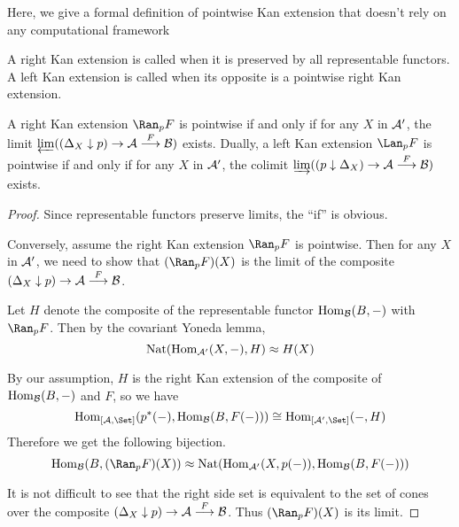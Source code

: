   Here, we give a formal definition of pointwise Kan extension that doesn't rely on any computational framework
  \begin{defn}
    A right Kan extension is called  when it is preserved by all representable functors. A left Kan extension is called  when its opposite is a pointwise right Kan extension.
  \end{defn}

  \begin{thm}\label{thm:pointwise Kan extension}
    A right Kan extension $\Ran_pF$ is pointwise if and only if for any $X$ in ${\cal A}'$, the limit $\operatorname*{\underleftarrow{\lim}}((\Delta_X\downarrow p)\to{\cal A}\stackrel{{F}}{\longrightarrow}{\cal B})$ exists.
    Dually, a left Kan extension $\Lan_pF$ is pointwise if and only if for any $X$ in ${\cal A}'$, the colimit $ \operatorname*{\underrightarrow{\lim}}((p\downarrow\Delta_X)\to{\cal A}\stackrel{{F}}{\longrightarrow}{\cal B})$ exists.
  \end{thm}
  \begin{proof}
    Since representable functors preserve limits, the ``if'' is obvious.

    Conversely, assume the right Kan extension $\Ran_pF$ is pointwise. Then for any $X$ in ${\cal A}'$, we need to show that $(\Ran_pF)(X)$ is the limit of the composite $(\Delta_X\downarrow p)\to{\cal A}\stackrel{{F}}{\longrightarrow}{\cal B}$.

    Let $H$ denote the composite of the representable functor $\operatorname{Hom}_{{\cal B}}(B,-)$ with $\Ran_pF$. Then by the covariant Yoneda lemma,
    \begin{equation*}
      \operatorname{Nat}(\operatorname{Hom}_{{\cal A}'}(X,-),H)\approx H(X)
    \end{equation*}

    By our assumption, $H$ is the right Kan extension of the composite of $\operatorname{Hom}_{{\cal B}}(B,-)$ and $F$, so we have
    \begin{equation*}
      \Hom_{[\Aa,\Set]}(p^{\ast}(-),\Hom_{\Bb}(B,F(-)))\cong\Hom_{[\Aa',\Set]}(-,H)
    \end{equation*}
    Therefore we get the following bijection.
    \begin{equation*}
      \Hom_{\Bb}(B,(\Ran_pF)(X))\approx\Nat(\Hom_{\Aa'}(X,p(-)),\Hom_{\Bb}(B,F(-)))
    \end{equation*}

    It is not difficult to see that the right side set is equivalent to the set of cones over the composite $(\Delta_X\downarrow p)\to{\cal A}\stackrel{{F}}{\longrightarrow}{\cal B}$. Thus $(\Ran_pF)(X)$ is its limit.
  \end{proof}


